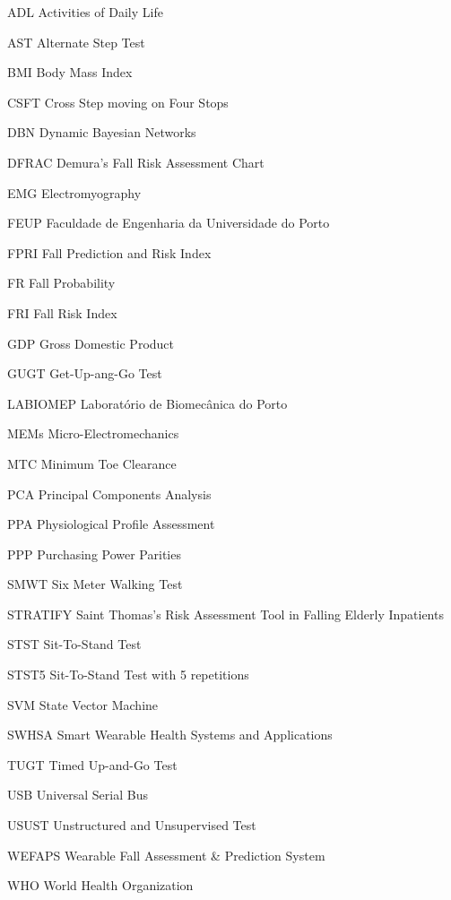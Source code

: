 \begin{abbrv}
\item[ADL]                   Activities of Daily Life
\item[AST]                   Alternate Step Test
\item[BMI]                   Body Mass Index
\item[CSFT]                  Cross Step moving on Four Stops
\item[DBN]                   Dynamic Bayesian Networks
\item[DFRAC]                 Demura's Fall Risk Assessment Chart
\item[EMG]                   Electromyography
\item[FEUP]                  Faculdade de Engenharia da Universidade do Porto
\item[FPRI]                  Fall Prediction and Risk Index
\item[FR]                    Fall Probability
\item[FRI]                   Fall Risk Index
\item[GDP]                   Gross Domestic Product
\item[GUGT]                  Get-Up-ang-Go Test
\item[LABIOMEP]              Laboratório de Biomecânica do Porto
\item[MEMs]                  Micro-Electromechanics
\item[MTC]                   Minimum Toe Clearance
\item[PCA]                   Principal Components Analysis
\item[PPA]                   Physiological Profile Assessment
\item[PPP]                   Purchasing Power Parities
\item[SMWT]                  Six Meter Walking Test
\item[STRATIFY]              Saint Thomas's Risk Assessment Tool in Falling Elderly Inpatients
\item[STST]                  Sit-To-Stand Test
\item[STST5]                 Sit-To-Stand Test with 5 repetitions
\item[SVM]                   State Vector Machine
\item[SWHSA]                 Smart Wearable Health Systems and Applications
\item[TUGT]                  Timed Up-and-Go Test
\item[USB]                   Universal Serial Bus
\item[USUST]                 Unstructured and Unsupervised Test
\item[WEFAPS]                Wearable Fall Assessment \& Prediction System
\item[WHO]                   World Health Organization
\end{abbrv}
